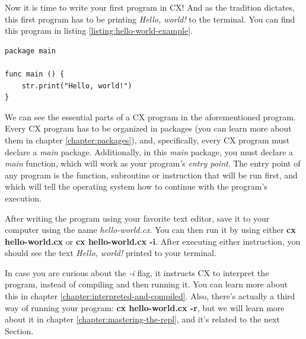\documentclass[11pt,fleqn,openany]{book} %
\begin{document}
Now it is time to write your first program in CX! And as the tradition dictates, this first program has to be printing \emph{Hello, world!} to the terminal. You can find this program in listing \ref{listing:hello-world-example}.

\begin{lstlisting}[caption={"Hello, world!" example},captionpos=b,label={listing:hello-world-example}]
package main

func main () {
 	str.print("Hello, world!")
}
\end{lstlisting}

We can see the essential parts of a CX program in the aforementioned program. Every CX program has to be organized in packages (you can learn more about them in chapter \ref{chapter:packages}), and, specifically, every CX program must declare a \emph{main} package. Additionally, in this \emph{main} package, you must declare a \emph{main} function, which will work as your program's \emph{entry point}. The entry point of any program is the function, subroutine or instruction that will be run first, and which will tell the operating system how to continue with the program's execution.

After writing the program using your favorite text editor, save it to your computer using the name \emph{hello-world.cx}. You can then run it by using either \textbf{cx hello-world.cx} or \textbf{cx hello-world.cx -i}. After executing either instruction, you should see the text \textit{Hello, world!} printed to your terminal.

In case you are curious about the \emph{-i} flag, it instructs CX to interpret the program, instead of compiling and then running it. You can learn more about this in chapter \ref{chapter:interpreted-and-compiled}. Also, there's actually a third way of running your program: \textbf{cx hello-world.cx -r}, but we will learn more about it in chapter \ref{chapter:mastering-the-repl}, and it's related to the next Section.



\end{document}
